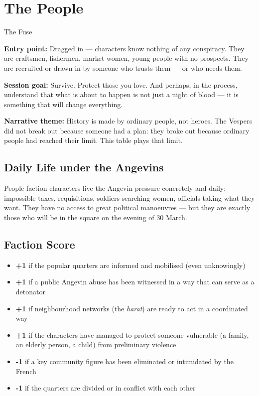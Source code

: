\secsep

\section{The People}
\textcolor{oro}{\cinzel\large The Fuse}

\filetto

\textbf{Entry point:} Dragged in --- characters know nothing of any
conspiracy. They are craftsmen, fishermen, market women, young people
with no prospects. They are recruited or drawn in by someone who trusts
them --- or who needs them.

\textbf{Session goal:} Survive. Protect those you love. And perhaps,
in the process, understand that what is about to happen is not just
a night of blood --- it is something that will change everything.

\textbf{Narrative theme:} History is made by ordinary people, not
heroes. The Vespers did not break out because someone had a plan: they
broke out because ordinary people had reached their limit. This table
plays that limit.

\subsection{Daily Life under the Angevins}

People faction characters live the Angevin pressure concretely and
daily: impossible taxes, requisitions, soldiers searching women, officials
taking what they want. They have no access to great political manoeuvres
--- but they are exactly those who will be in the square on the evening
of 30 March.

\subsection{Faction Score}

\begin{itemize}[nosep]
  \item \textbf{+1} if the popular quarters are informed and mobilised
    (even unknowingly)
  \item \textbf{+1} if a public Angevin abuse has been witnessed in a
    way that can serve as a detonator
  \item \textbf{+1} if neighbourhood networks (the \textit{harat}) are
    ready to act in a coordinated way
  \item \textbf{+1} if the characters have managed to protect someone
    vulnerable (a family, an elderly person, a child) from preliminary
    violence
  \item \textbf{-1} if a key community figure has been eliminated or
    intimidated by the French
  \item \textbf{-1} if the quarters are divided or in conflict with
    each other
\end{itemize}

